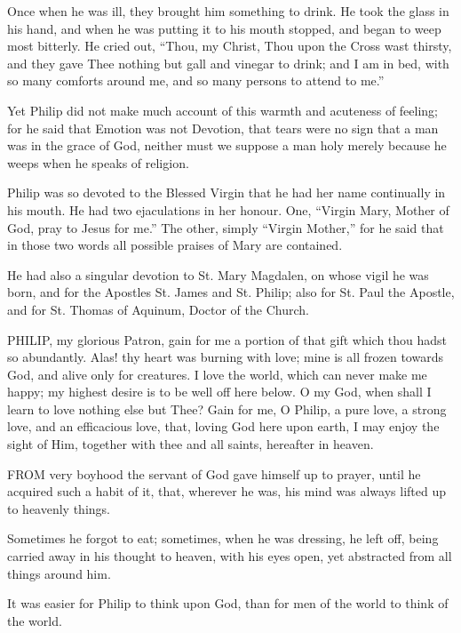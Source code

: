 Once when he was ill, they
brought him something to drink. He took the glass in his hand, and when
he was putting it to his mouth stopped, and began to weep most bitterly.
He cried out, ``Thou, my Christ, Thou upon the Cross wast thirsty, and
they gave Thee nothing but gall and vinegar to drink; and I am in bed,
with so many comforts around me, and so many persons to attend to me.''

Yet Philip did not make much
account of this warmth and acuteness of feeling; for he said that
Emotion was not Devotion, that tears were no sign that a man was in the
grace of God, neither must we suppose a man holy merely because he weeps
when he speaks of religion.

Philip was so devoted to the
Blessed Virgin that he had her name continually in his mouth. He had two
ejaculations in her honour. One, ``Virgin Mary, Mother of God, pray to
Jesus for me.'' The other, simply ``Virgin Mother,'' for he said that
in those two words all possible praises of Mary are contained.

He had also a singular devotion
to St. Mary Magdalen, on whose vigil he was born, and for the Apostles
St. James and St. Philip; also for St. Paul the Apostle, and for St.
Thomas of Aquinum, Doctor of the Church.


PHILIP, my glorious
Patron, gain for me a portion of that gift which thou hadst so
abundantly. Alas! thy heart was burning with love; mine is all frozen
towards God, and alive only for creatures. I love the world, which can
never make me happy; my highest desire is to be well off here below. O
my God, when shall I learn to love nothing else but Thee? Gain for me, O
Philip, a pure love, a strong love, and an efficacious love, that,
loving God here upon earth, I may enjoy the sight of Him, together with
thee and all saints, hereafter in heaven.



FROM very boyhood the
servant of God gave himself up to prayer, until he acquired such a habit
of it, that, wherever he was, his mind was always lifted up to heavenly
things.

Sometimes he forgot to eat;
sometimes, when he was dressing, he left off, being carried away in his
thought to heaven, with his eyes open, yet abstracted from all things
around him.

It was easier for Philip to
think upon God, than for men of the world to think of the world.

